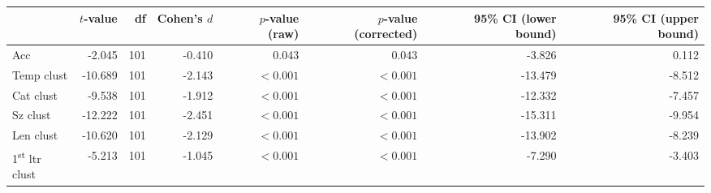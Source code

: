 \begin{tabular}{lrrrrrrr}
\toprule
 & $t$-value & df & Cohen's $d$ & $p$-value (raw) & $p$-value (corrected) & 95\% CI (lower bound) & 95\% CI (upper bound) \\
\midrule
\rowcolor[HTML]{fffee3} Acc & -2.045 & 101 & -0.410 & 0.043 & 0.043 & -3.826 & 0.112 \\
\rowcolor[HTML]{fffee3} Temp clust & -10.689 & 101 & -2.143 & $< 0.001$ & $< 0.001$ & -13.479 & -8.512 \\
\rowcolor[HTML]{fffee3} Cat clust & -9.538 & 101 & -1.912 & $< 0.001$ & $< 0.001$ & -12.332 & -7.457 \\
\rowcolor[HTML]{fffee3} Sz clust & -12.222 & 101 & -2.451 & $< 0.001$ & $< 0.001$ & -15.311 & -9.954 \\
\rowcolor[HTML]{fffee3} Len clust & -10.620 & 101 & -2.129 & $< 0.001$ & $< 0.001$ & -13.902 & -8.239 \\
\rowcolor[HTML]{fffee3} 1\textsuperscript{st} ltr clust & -5.213 & 101 & -1.045 & $< 0.001$ & $< 0.001$ & -7.290 & -3.403 \\
\bottomrule
\end{tabular}
